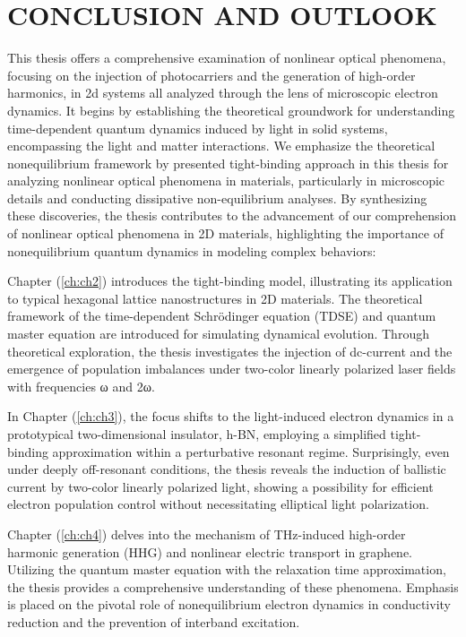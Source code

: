 \chapter{CONCLUSION AND OUTLOOK \label{ch:ch6}}
This thesis offers a comprehensive examination of nonlinear optical phenomena, focusing on the injection of photocarriers and the generation of high-order harmonics, in 2d systems all analyzed through the lens of microscopic electron dynamics. It begins by establishing the theoretical groundwork for understanding time-dependent quantum dynamics induced by light in solid systems, encompassing the light and matter interactions. We emphasize the theoretical nonequilibrium framework by presented tight-binding approach in this thesis for analyzing nonlinear optical phenomena in materials, particularly in microscopic details and conducting dissipative non-equilibrium analyses. By synthesizing these discoveries, the thesis contributes to the advancement of our comprehension of nonlinear optical phenomena in 2D materials, highlighting the importance of nonequilibrium quantum dynamics in modeling complex behaviors:

Chapter (\ref{ch:ch2}) introduces the tight-binding model, illustrating its application to typical hexagonal lattice nanostructures in 2D materials. The theoretical framework of the time-dependent Schrödinger equation (TDSE) and quantum master equation are introduced for simulating dynamical evolution. Through theoretical exploration, the thesis investigates the injection of dc-current and the emergence of population imbalances under two-color linearly polarized laser fields with frequencies ω and 2ω.

In Chapter (\ref{ch:ch3}), the focus shifts to the light-induced electron dynamics in a prototypical two-dimensional insulator, \gls{h-BN}, employing a simplified tight-binding approximation within a perturbative resonant regime. Surprisingly, even under deeply off-resonant conditions, the thesis reveals the induction of ballistic current by two-color linearly polarized light, showing a possibility for efficient electron population control without necessitating elliptical light polarization.

Chapter (\ref{ch:ch4}) delves into the mechanism of THz-induced high-order harmonic generation (HHG) and nonlinear electric transport in graphene. Utilizing the quantum master equation with the relaxation time approximation, the thesis provides a comprehensive understanding of these phenomena. Emphasis is placed on the pivotal role of nonequilibrium electron dynamics in conductivity reduction and the prevention of interband excitation.

